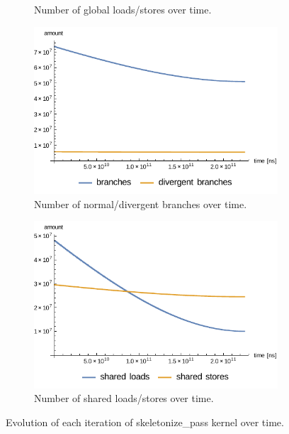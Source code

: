 \documentclass[11pt,a4paper]{article}
\begin{document}
\begin{figure}[ht]
\begin{subfigure}[t]{0.5\linewidth}
                \caption{Number of global loads/stores over time.}
                \label{fig:black_number_of_global_loads_stores_over_time}
            \end{subfigure}
            \begin{subfigure}[t]{0.5\linewidth}
                \centering
                \includegraphics[width=\linewidth]{figs/black_iteration_branch_and_divergent_branch_plot.pdf}
                \caption{Number of normal/divergent branches over time.}
                \label{fig:black_number_of_branches_over_time}
            \end{subfigure}%
            \begin{subfigure}[t]{0.5\linewidth}
                \centering
                \includegraphics[width=\linewidth]{figs/black_iteration_shared_load_store_plot.pdf}
                \caption{Number of shared loads/stores over time.}
                \label{fig:black_number_of_shared_loads_stores_over_time}
                \vspace{4ex}
            \end{subfigure}
            \caption{Evolution of each iteration of skeletonize\_pass kernel over time.}
            \label{fig:evolution_of_each_iteration_of_skeletonize_pass_kernel_over_time}
        \end{figure}
\end{document}
